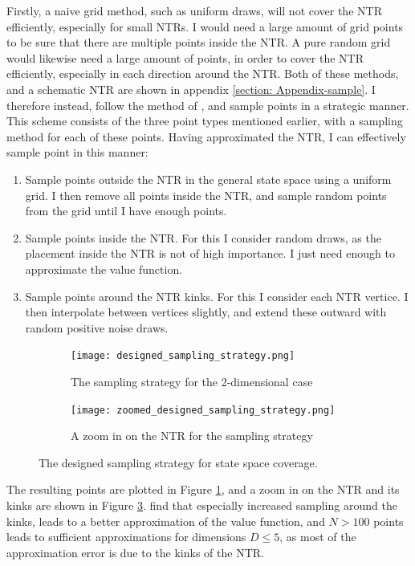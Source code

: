 \documentclass[11pt]{article}
\begin{document}
Firstly, a naive grid method, such as uniform draws, will not cover the \ac{NTR} efficiently, especially for small \ac{NTR}s.
I would need a large amount of grid points to be sure that there are multiple points inside the NTR.
A pure random grid would likewise need a large amount of points, in order to cover the \ac{NTR} efficiently, especially in each direction around the NTR.
Both of these methods, and a schematic \ac{NTR} are shown in appendix \ref{section: Appendix-sample}.
I therefore instead, follow the method of \autocite{Scheidegger2023}, and sample points in a strategic manner.
This scheme consists of the three point types mentioned earlier, with a sampling method for each of these points.
Having approximated the \ac{NTR}, I can effectively sample point in this manner:
\begin{enumerate}
  \item Sample points outside the \ac{NTR} in the general state space using a uniform grid. I then remove all points inside the \ac{NTR}, and sample random points from the grid until I have enough points.
  \item Sample points inside the \ac{NTR}. For this I consider random draws, as the placement inside the NTR is not of high importance. I just need enough to approximate the value function.
  \item Sample points around the \ac{NTR} kinks. For this I consider each \ac{NTR} vertice. I then interpolate between vertices slightly, and extend these outward with random positive noise draws. 
\end{enumerate}
\begin{figure}[!ht]
  \centering
    \begin{subfigure}[t]{0.48\textwidth}
        \centering
        \texttt{[image: designed\_sampling\_strategy.png]}
        \caption{The sampling strategy for the 2-dimensional case}
        \label{fig: Designed_sampling_strategy}
    \end{subfigure}%
    \hfill
    \begin{subfigure}[t]{0.48\textwidth}
        \centering
        \texttt{[image: zoomed\_designed\_sampling\_strategy.png]}
        \caption{A zoom in on the \ac{NTR} for the sampling strategy}
        \label{fig: Designed_sampling_strategy-zoom}
    \end{subfigure}
    \caption{The designed sampling strategy for state space coverage.}
    \end{figure}
The resulting points are plotted in Figure \ref{fig: Designed_sampling_strategy}, and a zoom in on the \ac{NTR} and its kinks are shown in Figure \ref{fig: Designed_sampling_strategy-zoom}.
\autocite{Scheidegger2023} find that especially increased sampling around the kinks, leads to a better approximation of the value function,
and $N>100$ points leads to sufficient approximations for dimensions $D\leq 5$, as most of the approximation error is due to the kinks of the \ac{NTR}.
\end{document}
